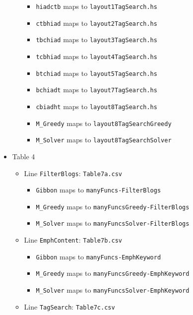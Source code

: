 \begin{itemize}
\begin{itemize}
    \begin{itemize}
    \tightlist
    \item
      \texttt{hiadctb} maps to \texttt{layout1TagSearch.hs}
    \item
      \texttt{ctbhiad} maps to \texttt{layout2TagSearch.hs}
    \item
      \texttt{tbchiad} maps to \texttt{layout3TagSearch.hs}
    \item
      \texttt{tcbhiad} maps to \texttt{layout4TagSearch.hs}
    \item
      \texttt{btchiad} maps to \texttt{layout5TagSearch.hs}
    \item
      \texttt{bchiadt} maps to \texttt{layout7TagSearch.hs}
    \item
      \texttt{cbiadht} maps to \texttt{layout8TagSearch.hs}
    \item
      \texttt{M\_Greedy} maps to \texttt{layout8TagSearchGreedy}
    \item
      \texttt{M\_Solver} maps to \texttt{layout8TagSearchSolver}
    \end{itemize}
  \end{itemize}
\item
  Table 4

  \begin{itemize}
  \tightlist
  \item
    Line \texttt{FilterBlogs}: \texttt{Table7a.csv}

    \begin{itemize}
    \tightlist
    \item
      \texttt{Gibbon} maps to \texttt{manyFuncs-FilterBlogs}
    \item
      \texttt{M\_Greedy} maps to \texttt{manyFuncsGreedy-FilterBlogs}
    \item
      \texttt{M\_Solver} maps to \texttt{manyFuncsSolver-FilterBlogs}
    \end{itemize}
  \item
    Line \texttt{EmphContent}: \texttt{Table7b.csv}

    \begin{itemize}
    \tightlist
    \item
      \texttt{Gibbon} maps to \texttt{manyFuncs-EmphKeyword}
    \item
      \texttt{M\_Greedy} maps to \texttt{manyFuncsGreedy-EmphKeyword}
    \item
      \texttt{M\_Solver} maps to \texttt{manyFuncsSolver-EmphKeyword}
    \end{itemize}
  \item
    Line \texttt{TagSearch}: \texttt{Table7c.csv}


\end{itemize}
\end{itemize}

